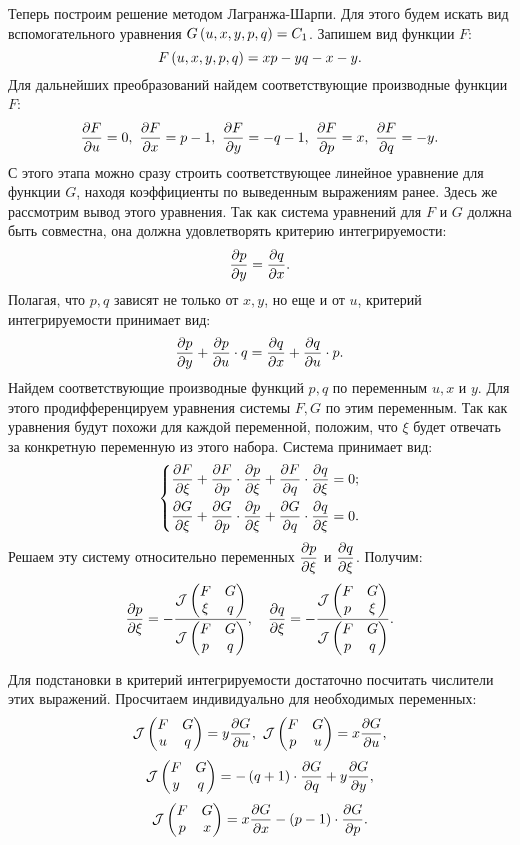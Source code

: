 		\vspace{10pt}
		
		Теперь построим решение методом Лагранжа-Шарпи. Для этого будем искать вид вспомогательного уравнения $G \left( u, x, y, p, q \right) = C_1$. Запишем вид функции $F$:
		\[ F \left( u, x, y, p, q \right) = xp - yq - x - y. \]
		Для дальнейших преобразований найдем соответствующие производные функции $F$:
		\[ \dfrac{\partial F}{\partial u} = 0, ~ \dfrac{\partial F}{\partial x} = p - 1, ~ \dfrac{\partial F}{\partial y} = -q - 1, ~ \dfrac{\partial F}{\partial p} = x, ~ \dfrac{\partial F}{\partial q} = -y. \]
		С этого этапа можно сразу строить соответствующее линейное уравнение для функции $G$, находя коэффициенты по выведенным выражениям ранее. Здесь же рассмотрим вывод этого уравнения. Так как система уравнений для $F$ и $G$ должна быть совместна, она должна удовлетворять критерию интегрируемости:
		\[ \dfrac{\partial p}{\partial y} = \dfrac{\partial q}{\partial x}. \]
		Полагая, что $p, q$ зависят не только от $x, y$, но еще и от $u$, критерий интегрируемости принимает вид:
		\[ \dfrac{\partial p}{\partial y} + \dfrac{\partial p}{\partial u} \cdot q = \dfrac{\partial q}{\partial x} + \dfrac{\partial q}{\partial u} \cdot p. \]
		Найдем соответствующие производные функций $p, q$ по переменным $u, x$ и $y$. Для этого продифференцируем уравнения системы $F, G$ по этим переменным. Так как уравнения будут похожи для каждой переменной, положим, что $\xi$ будет отвечать за конкретную переменную из этого набора. Система принимает вид:
		\[ \left\lbrace \begin{split} 
			\dfrac{\partial F}{\partial \xi} + \dfrac{\partial F}{\partial p} \cdot \dfrac{\partial p}{\partial \xi} + \dfrac{\partial F}{\partial q} \cdot \dfrac{\partial q}{\partial \xi} &= 0; \\
			\dfrac{\partial G}{\partial \xi} + \dfrac{\partial G}{\partial p} \cdot \dfrac{\partial p}{\partial \xi} + \dfrac{\partial G}{\partial q} \cdot \dfrac{\partial q}{\partial \xi} &= 0. 
		\end{split} \right. \]
		Решаем эту систему относительно переменных $\dfrac{\partial p}{\partial \xi}$ и $\dfrac{\partial q}{\partial \xi}$. Получим:
		\[ 
			\dfrac{\partial p}{\partial \xi} = - \frac{\mathcal{J} \left( \begin{matrix} F & G \\ \xi & q \end{matrix} \right)}{\mathcal{J} \left( \begin{matrix} F & G \\ p & q \end{matrix} \right)}, \quad
			\dfrac{\partial q}{\partial \xi} = - \frac{\mathcal{J} \left( \begin{matrix} F & G \\ p & \xi \end{matrix} \right)}{\mathcal{J} \left( \begin{matrix} F & G \\ p & q \end{matrix} \right)}. 
		\]

		Для подстановки в критерий интегрируемости достаточно посчитать числители этих выражений. Просчитаем индивидуально для необходимых переменных:
		\[ \mathcal{J} \left( \begin{matrix} F & G \\ u & q \end{matrix} \right) = y \dfrac{\partial G}{\partial u}, ~ \mathcal{J} \left( \begin{matrix} F & G \\ p & u \end{matrix} \right) = x \dfrac{\partial G}{\partial u}, \]
		\[ \mathcal{J} \left( \begin{matrix} F & G \\ y & q \end{matrix} \right) = -\left( q + 1 \right) \cdot \dfrac{\partial G}{\partial q} + y \dfrac{\partial G}{\partial y}, \]
		\[ \mathcal{J} \left( \begin{matrix} F & G \\ p & x \end{matrix} \right) = x \dfrac{\partial G}{\partial x} - \left( p - 1 \right) \cdot \dfrac{\partial G}{\partial p}. \]

